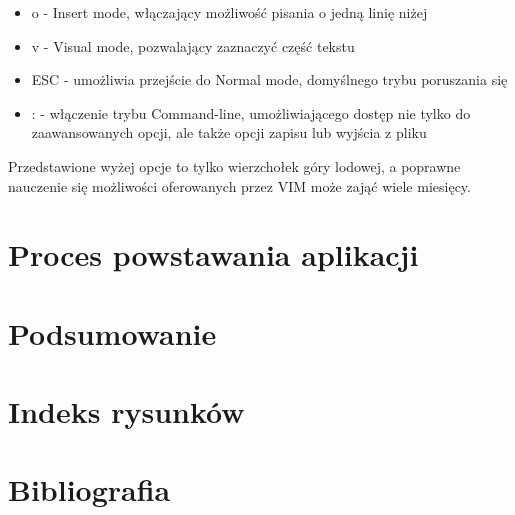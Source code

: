 \documentclass[12pt, a4paper]{article}
\begin{document}
\begin{sloppypar}
{{\begin{itemize}
\begin{itemize}
        \item o - Insert mode, włączający możliwość pisania o jedną linię niżej
        \item v - Visual mode, pozwalający zaznaczyć część tekstu
        \item ESC - umożliwia przejście do Normal mode, domyślnego trybu poruszania się
        \item : - włączenie trybu Command-line, umożliwiającego dostęp nie tylko do
        zaawansowanych opcji, ale także opcji zapisu lub wyjścia z pliku
      \end{itemize} 
    \end{itemize}
    Przedstawione wyżej opcje to tylko wierzchołek góry lodowej, a poprawne nauczenie
    się możliwości oferowanych przez VIM może zająć wiele miesięcy.
  }
}

\section{Proces powstawania aplikacji}
{
}

\section{Podsumowanie}
{
}

\section{Indeks rysunków}

\section{Bibliografia}
{
  \printbibliography
}

\end{sloppypar}
\end{document}
